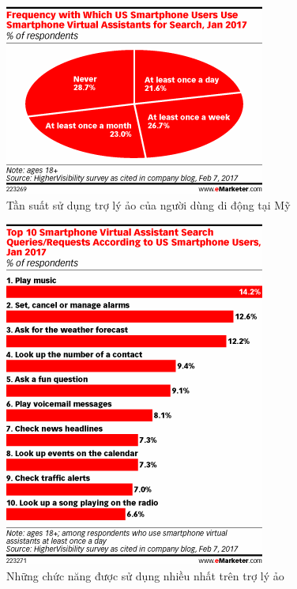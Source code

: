 \documentclass{beamer}
\begin{document}
\begin{frame}
\begin{figure}
\centering
\includegraphics[scale=0.5]{emarketer_1}
\caption{Tần suất sử dụng trợ lý ảo của người dùng di động tại Mỹ\footnotemark}
\end{figure}


\end{frame}

\begin{frame}
\begin{figure}
\centering
\includegraphics[scale=0.45]{emarketer_2}
\caption{Những chức năng được sử dụng nhiều nhất trên trợ lý ảo\footnotemark}
\end{figure}


\end{frame}
\end{document}
